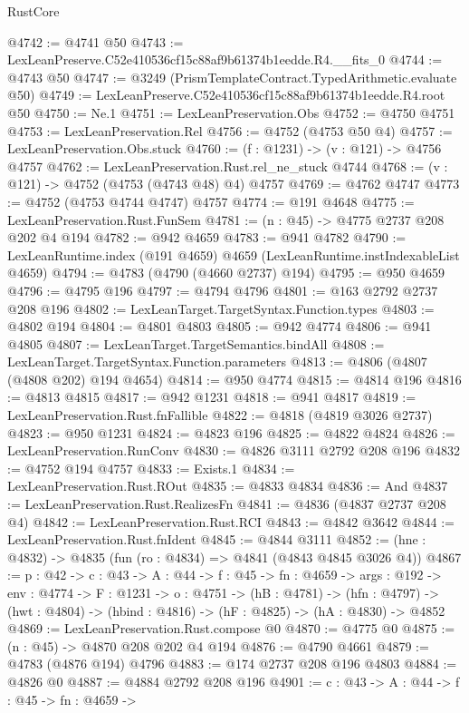 \begin{lexlean}{RustCore}
\begin{coremodule}
@4742 := @4741 @50
@4743 := LexLeanPreserve.C52e410536cf15c88af9b61374b1eedde.R4.__fits_0
@4744 := @4743 @50
@4747 := @3249 (PrismTemplateContract.TypedArithmetic.evaluate @50)
@4749 := LexLeanPreserve.C52e410536cf15c88af9b61374b1eedde.R4.root @50
@4750 := Ne.{1}
@4751 := LexLeanPreservation.Obs
@4752 := @4750 @4751
@4753 := LexLeanPreservation.Rel
@4756 := @4752 (@4753 @50 @4)
@4757 := LexLeanPreservation.Obs.stuck
@4760 := (f : @1231) -> (v : @121) -> @4756 @4757
@4762 := LexLeanPreservation.Rust.rel_ne_stuck @4744
@4768 := (v : @121) -> @4752 (@4753 (@4743 @48) @4) @4757
@4769 := @4762 @4747
@4773 := @4752 (@4753 @4744 @4747) @4757
@4774 := @191 @4648
@4775 := LexLeanPreservation.Rust.FunSem
@4781 := (n : @45) -> @4775 @2737 @208 @202 @4 @194
@4782 := @942 @4659
@4783 := @941 @4782
@4790 := LexLeanRuntime.index (@191 @4659) @4659 (LexLeanRuntime.instIndexableList @4659)
@4794 := @4783 (@4790 (@4660 @2737) @194)
@4795 := @950 @4659
@4796 := @4795 @196
@4797 := @4794 @4796
@4801 := @163 @2792 @2737 @208 @196
@4802 := LexLeanTarget.TargetSyntax.Function.types
@4803 := @4802 @194
@4804 := @4801 @4803
@4805 := @942 @4774
@4806 := @941 @4805
@4807 := LexLeanTarget.TargetSemantics.bindAll
@4808 := LexLeanTarget.TargetSyntax.Function.parameters
@4813 := @4806 (@4807 (@4808 @202) @194 @4654)
@4814 := @950 @4774
@4815 := @4814 @196
@4816 := @4813 @4815
@4817 := @942 @1231
@4818 := @941 @4817
@4819 := LexLeanPreservation.Rust.fnFallible
@4822 := @4818 (@4819 @3026 @2737)
@4823 := @950 @1231
@4824 := @4823 @196
@4825 := @4822 @4824
@4826 := LexLeanPreservation.RunConv
@4830 := @4826 @3111 @2792 @208 @196
@4832 := @4752 @194 @4757
@4833 := Exists.{1}
@4834 := LexLeanPreservation.Rust.ROut
@4835 := @4833 @4834
@4836 := And
@4837 := LexLeanPreservation.Rust.RealizesFn
@4841 := @4836 (@4837 @2737 @208 @4)
@4842 := LexLeanPreservation.Rust.RCI
@4843 := @4842 @3642
@4844 := LexLeanPreservation.Rust.fnIdent
@4845 := @4844 @3111
@4852 := (hne : @4832) -> @4835 (fun (ro : @4834) => @4841 (@4843 @4845 @3026 @4))
@4867 := {p : @42} ->
  {c : @43} ->
  {A : @44} ->
  {f : @45} ->
  {fn : @4659} ->
  {args : @192} ->
  {env : @4774} ->
  {F : @1231} ->
  {o : @4751} ->
  (hB : @4781) ->
  (hfn : @4797) -> (hwt : @4804) -> (hbind : @4816) -> (hF : @4825) -> (hA : @4830) -> @4852
@4869 := LexLeanPreservation.Rust.compose @0
@4870 := @4775 @0
@4875 := (n : @45) -> @4870 @208 @202 @4 @194
@4876 := @4790 @4661
@4879 := @4783 (@4876 @194) @4796
@4883 := @174 @2737 @208 @196 @4803
@4884 := @4826 @0
@4887 := @4884 @2792 @208 @196
@4901 := {c : @43} ->
  {A : @44} ->
  {f : @45} ->
  {fn : @4659} ->

\end{coremodule}
\end{lexlean}
